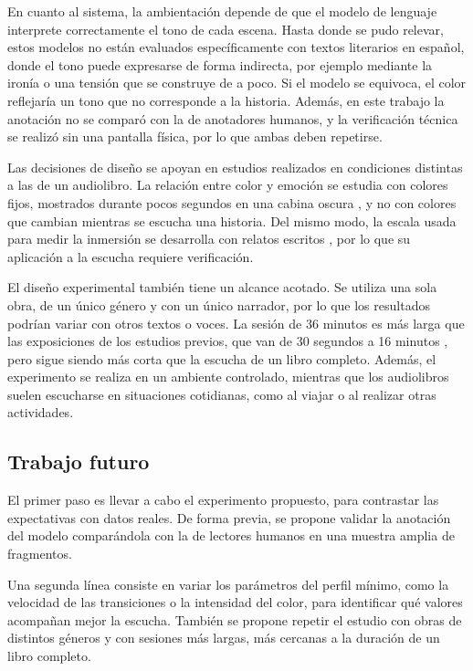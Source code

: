 \documentclass[journal]{IEEEtran}
\begin{document}
En cuanto al sistema, la ambientación depende de que el modelo de lenguaje interprete correctamente el tono de cada escena. Hasta donde se pudo relevar, estos modelos no están evaluados específicamente con textos literarios en español, donde el tono puede expresarse de forma indirecta, por ejemplo mediante la ironía o una tensión que se construye de a poco. Si el modelo se equivoca, el color reflejaría un tono que no corresponde a la historia. Además, en este trabajo la anotación no se comparó con la de anotadores humanos, y la verificación técnica se realizó sin una pantalla física, por lo que ambas deben repetirse.
 
Las decisiones de diseño se apoyan en estudios realizados en condiciones distintas a las de un audiolibro. La relación entre color y emoción se estudia con colores fijos, mostrados durante pocos segundos en una cabina oscura \cite{wilmsoberfeld2018}, y no con colores que cambian mientras se escucha una historia. Del mismo modo, la escala usada para medir la inmersión se desarrolla con relatos escritos \cite{greenbrock2000, appel2015}, por lo que su aplicación a la escucha requiere verificación.
 
El diseño experimental también tiene un alcance acotado. Se utiliza una sola obra, de un único género y con un único narrador, por lo que los resultados podrían variar con otros textos o voces. La sesión de 36 minutos es más larga que las exposiciones de los estudios previos, que van de 30 segundos a 16 minutos \cite{wilmsoberfeld2018, rogowsky2016}, pero sigue siendo más corta que la escucha de un libro completo. Además, el experimento se realiza en un ambiente controlado, mientras que los audiolibros suelen escucharse en situaciones cotidianas, como al viajar o al realizar otras actividades.
 
\subsection{Trabajo futuro}
El primer paso es llevar a cabo el experimento propuesto, para contrastar las expectativas con datos reales. De forma previa, se propone validar la anotación del modelo comparándola con la de lectores humanos en una muestra amplia de fragmentos.
 
Una segunda línea consiste en variar los parámetros del perfil mínimo, como la velocidad de las transiciones o la intensidad del color, para identificar qué valores acompañan mejor la escucha. También se propone repetir el estudio con obras de distintos géneros y con sesiones más largas, más cercanas a la duración de un libro completo.
 
\end{document}
